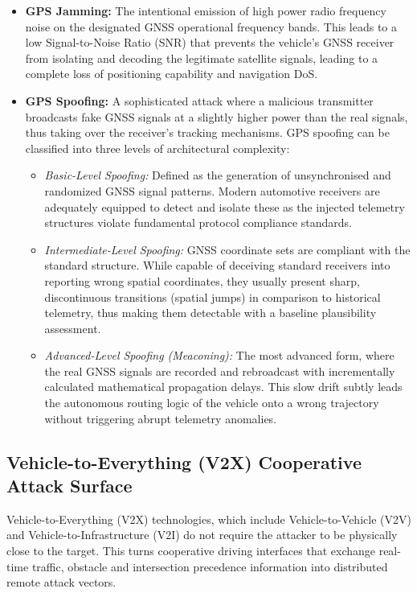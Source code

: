 \begin{itemize}
    \item \textbf{GPS Jamming:} The intentional emission of high power radio frequency noise on the designated \gls{GNSS} operational frequency bands. This leads to a low Signal-to-Noise Ratio (SNR) that prevents the vehicle's \gls{GNSS} receiver from isolating and decoding the legitimate satellite signals, leading to a complete loss of positioning capability and navigation \gls{DoS}.
    
    \item \textbf{GPS Spoofing:} A sophisticated attack where a malicious transmitter broadcasts fake \gls{GNSS} signals at a slightly higher power than the real signals, thus taking over the receiver's tracking mechanisms. GPS spoofing can be classified into three levels of architectural complexity:
    \begin{itemize}
        \item \textit{Basic-Level Spoofing:} Defined as the generation of unsynchronised and randomized \gls{GNSS} signal patterns. Modern automotive receivers are adequately equipped to detect and isolate these as the injected telemetry structures violate fundamental protocol compliance standards.
        \item \textit{Intermediate-Level Spoofing:} \gls{GNSS} coordinate sets are compliant with the standard structure. While capable of deceiving standard receivers into reporting wrong spatial coordinates, they usually present sharp, discontinuous transitions (spatial jumps) in comparison to historical telemetry, thus making them detectable with a baseline plausibility assessment.
        \item \textit{Advanced-Level Spoofing (Meaconing):} The most advanced form, where the real \gls{GNSS} signals are recorded and rebroadcast with incrementally calculated mathematical propagation delays. This slow drift subtly leads the autonomous routing logic of the vehicle onto a wrong trajectory without triggering abrupt telemetry anomalies.
    \end{itemize}
\end{itemize}

\subsection{Vehicle-to-Everything (V2X) Cooperative Attack Surface}
Vehicle-to-Everything (\gls{V2X}) technologies, which include Vehicle-to-Vehicle (V2V) and Vehicle-to-Infrastructure (V2I) do not require the attacker to be physically close to the target. This turns cooperative driving interfaces that exchange real-time traffic, obstacle and intersection precedence information into distributed remote attack vectors. 

